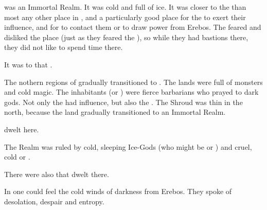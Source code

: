 \UltimaThule was an Immortal Realm. 
It was cold and full of ice.
It was closer to the \CrystalSphere than most any other place in \Miith, and a particularly good place for the \banelords to exert their influence, and for \Miithians to contact them or to draw power from Erebos.
The \resphain feared and disliked the place (just as they feared the \banelords), so while they had bastions there, they did not like to spend time there. 

It was to \UltimaThule that . 

The nothern regions of \Azmith gradually transitioned to \UltimaThule.
The lands were full of monsters and cold magic.
The inhabitants (\human or \scatha) were fierce barbarians who prayed to dark gods. 
Not only the \banelords had influence, but also the \xs. 
The Shroud was thin in the north, because the land gradually transitioned to an Immortal Realm. 

\Gnomphilim dwelt here. 

The Realm was ruled by cold, sleeping Ice-Gods (who might be \xss or \dragons) and cruel, cold  or . 

There were also \quiljaaran that dwelt there. 

In \UltimaThule one could feel the cold winds of darkness from Erebos.
They spoke of desolation, despair and entropy.


